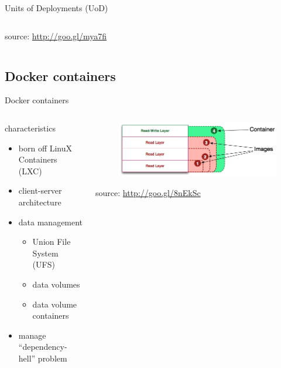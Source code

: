 \begin{frame}{Units of Deployments (UoD)}
{\begin{columns}
\begin{column}{0.3\textwidth}
\begin{figure}
				\end{figure}
				\begin{flushright}
					\tiny{source: \url{http://goo.gl/mya7fi}}
				\end{flushright}
			\end{column}
		\end{columns}
	}
\end{frame}

\subsection{Docker containers}
\begin{frame}{Docker containers}
	\only<1>
	{
		\begin{columns}
			\begin{column}{0.5\textwidth}
				characteristics
				\begin{itemize}
					\item{\footnotesize{born off LinuX Containers (LXC)}}
					\item{\footnotesize{client-server architecture}}
					\item{\footnotesize{data management}}
					\begin{itemize}
						\item{\scriptsize{Union File System (UFS)}}
						\item{\scriptsize{data volumes}}
						\item{\scriptsize{data volume containers}}
					\end{itemize}
					\item{\footnotesize{manage ``dependency-hell'' problem}}
				\end{itemize}
			\end{column}
			\begin{column}{0.5\textwidth}
				\begin{figure}
					\centering{}
					\includegraphics[scale=0.3]{images/union-fs.png}
				\end{figure}
				\begin{flushright}
					\tiny{source: \url{http://goo.gl/8nEkSc}}

\end{flushright}
\end{column}
\end{columns}}
\end{frame}
